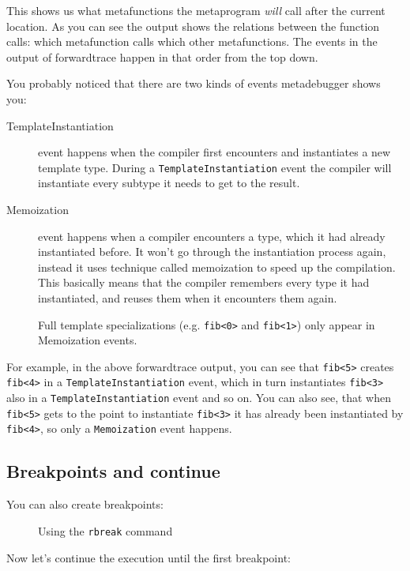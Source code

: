 \noindent
This shows us what metafunctions the metaprogram \textit{will} call after the
current location. As you can see the output shows the relations between the
function calls: which metafunction calls which other metafunctions. The events
in the output of forwardtrace happen in that order from the top down.

You probably noticed that there are two kinds of events metadebugger shows you:

\begin{description}
    \item[TemplateInstantiation] event happens when the compiler first
        encounters and instantiates a new template type. During a
        \texttt{TemplateInstantiation} event the compiler will instantiate
        every subtype it needs to get to the result.
    \item[Memoization] event happens when a compiler encounters a type, which
        it had already instantiated before. It won't go through the
        instantiation process again, instead it uses technique called
        memoization to speed up the compilation. This basically means that the
        compiler remembers every type it had instantiated, and reuses them when
        it encounters them again.

        Full template specializations (e.g. \texttt{fib<0>} and
        \texttt{fib<1>}) only appear in Memoization events.
\end{description}

For example, in the above forwardtrace output, you can see that \texttt{fib<5>}
creates \texttt{fib<4>} in a \texttt{TemplateInstantiation} event, which in
turn instantiates \texttt{fib<3>} also in a \texttt{TemplateInstantiation}
event and so on.  You can also see, that when \texttt{fib<5>} gets to the point
to instantiate \texttt{fib<3>} it has already been instantiated by
\texttt{fib<4>}, so only a \texttt{Memoization} event happens.

\subsection{Breakpoints and continue}

You can also create breakpoints:

\begin{figure}[H]
    
    \caption{Using the \texttt{rbreak} command}
\end{figure}

\noindent
Now let's continue the execution until the first breakpoint:

